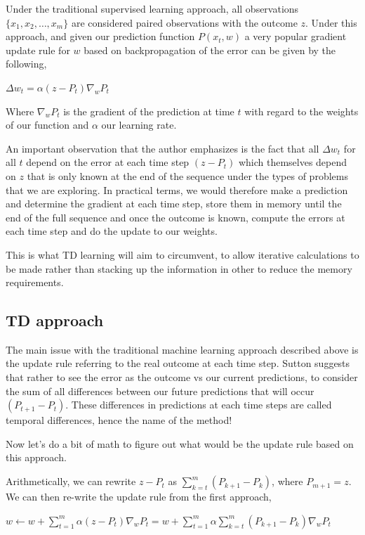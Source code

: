 \documentclass{article}
\begin{document}
Under the traditional supervised learning approach, all observations $\{ x_1, x_2, \dots, x_m \}$ are considered paired observations with the outcome $z$. Under this approach, and given our prediction function $P(x_t, w)$ a very popular gradient update rule for $w$ based on backpropagation of the error can be given by the following,

$\Delta w_t = \alpha (z - P_t) \nabla_w P_t$

Where $\nabla_w P_t$ is the gradient of the prediction at time $t$ with regard to the weights of our function and $\alpha$ our learning rate.

An important observation that the author emphasizes is the fact that all $\Delta w_t$ for all $t$ depend on the error at each time step $(z - P_t)$ which themselves depend on $z$ that is only known at the end of the sequence under the types of problems that we are exploring. In practical terms, we would therefore make a prediction and determine the gradient at each time step, store them in memory until the end of the full sequence and once the outcome is known, compute the errors at each time step and do the update to our weights.

This is what TD learning will aim to circumvent, to allow iterative calculations to be made rather than stacking up the information in other to reduce the memory requirements.

\subsection{TD approach}
The main issue with the traditional machine learning approach described above is the update rule referring to the real outcome at each time step. Sutton suggests that rather to see the error as the outcome vs our current predictions, to consider the sum of all differences between our future predictions that will occur $(P_{t+1} - P_t)$. These differences in predictions at each time steps are called temporal differences, hence the name of the method!

Now let's do a bit of math to figure out what would be the update rule based on this approach.

Arithmetically, we can rewrite $z - P_t$ as $\sum \limits_{k=t}^m(P_{k+1} - P_k)$, where $P_{m+1} = z$. We can then re-write the update rule from the first approach,

$w \leftarrow w + \sum \limits_{t=1}^m \alpha (z - P_t) \nabla_w P_t = w + \sum \limits_{t=1}^m \alpha \sum \limits_{k=t}^m (P_{k+1} - P_k) \nabla_w P_t$
\end{document}
